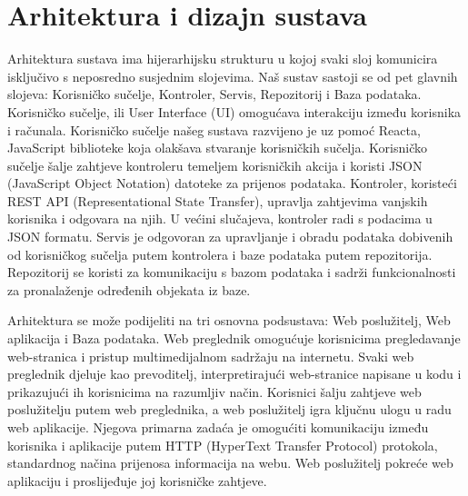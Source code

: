 \chapter{Arhitektura i dizajn sustava}
		
		 Arhitektura sustava ima hijerarhijsku strukturu u kojoj svaki sloj komunicira isključivo s neposredno susjednim slojevima. Naš sustav sastoji se od pet glavnih slojeva: Korisničko sučelje, Kontroler, Servis, Repozitorij i Baza podataka. Korisničko sučelje, ili User Interface (UI) omogućava interakciju između korisnika i računala. Korisničko sučelje našeg sustava razvijeno je uz pomoć Reacta, JavaScript biblioteke koja olakšava stvaranje korisničkih sučelja. Korisničko sučelje šalje zahtjeve kontroleru temeljem korisničkih akcija i koristi JSON (JavaScript Object Notation) datoteke za prijenos podataka. Kontroler, koristeći REST API (Representational State Transfer), upravlja zahtjevima vanjskih korisnika i odgovara na njih. U većini slučajeva, kontroler radi s podacima u JSON formatu. Servis je odgovoran za upravljanje i obradu podataka dobivenih od korisničkog sučelja putem kontrolera i baze podataka putem repozitorija. Repozitorij se koristi za komunikaciju s bazom podataka i sadrži funkcionalnosti za pronalaženje određenih objekata iz baze.	

		Arhitektura se može podijeliti na tri osnovna podsustava: Web poslužitelj, Web aplikacija i Baza podataka. Web preglednik omogućuje korisnicima pregledavanje web-stranica i pristup multimedijalnom sadržaju na internetu. Svaki web preglednik djeluje kao prevoditelj, interpretirajući web-stranice napisane u kodu i prikazujući ih korisnicima na razumljiv način. Korisnici šalju zahtjeve web poslužitelju putem web preglednika, a web poslužitelj igra ključnu ulogu u radu web aplikacije. Njegova primarna zadaća je omogućiti komunikaciju između korisnika i aplikacije putem HTTP (HyperText Transfer Protocol) protokola, standardnog načina prijenosa informacija na webu. Web poslužitelj pokreće web aplikaciju i proslijeđuje joj korisničke zahtjeve.

